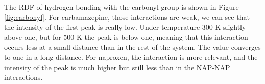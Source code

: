 The RDF of hydrogen bonding with the carbonyl group is shown in Figure \ref{fig:carbonyl}. For carbamazepine, those interactions are weak, we can see that the intensity of the first peak is really low. Under temperature 300 K slightly above one, but for 500 K the peak is below one, meaning that this interaction occurs less at a small distance than in the rest of the system. The value converges to one in a long distance. For naproxen, the interaction is more relevant, and the intensity of the peak is much higher but still less than in the NAP-NAP interactions.

\newpage
\begin{figure}[]
	\centering
	\\
	\vspace{-0.2cm}
	\\

\end{figure}
